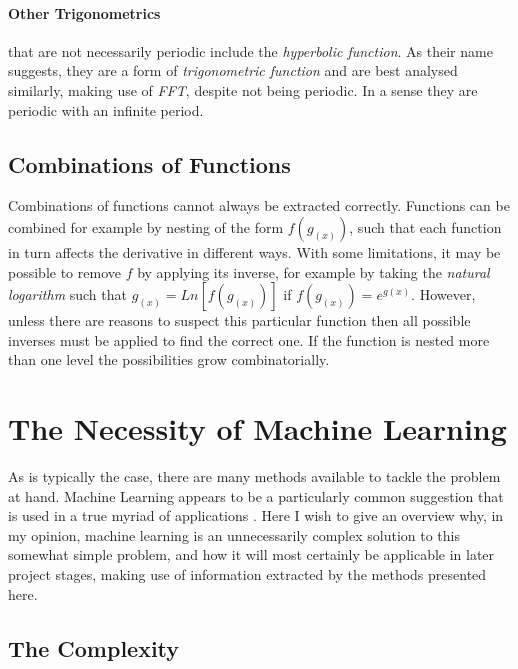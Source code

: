 \documentclass[main.tex]{subfiles}
\begin{document}
      \paragraph{Other Trigonometrics} that are not necessarily periodic include the \textit{hyperbolic function}. As their name suggests, they are a form of \textit{trigonometric function} and are best analysed similarly, making use of \textit{FFT}, despite not being periodic. In a sense they are periodic with an infinite period. 
    
    \subsection{Combinations of Functions}
      Combinations of functions cannot always be extracted correctly. Functions can be combined for example by nesting of the form $f(g_{(x)})$, such that each function in turn affects the derivative in different ways. With some limitations, it may be possible to remove $f$ by applying its inverse, for example by taking the \textit{natural logarithm} such that $g_{(x)}=Ln\left [ f(g_{(x)})\right ]$ if $f(g_{(x)}) = e^{g(x)}$. However, unless there are reasons to suspect this particular function then all possible inverses must be applied to find the correct one. If the function is nested more than one level the possibilities grow combinatorially. 
      
      
    
  \section{The Necessity of Machine Learning}
  
    As is typically the case, there are many methods available to tackle the problem at hand. Machine Learning appears to be a particularly common suggestion that is used in a true myriad of applications \cite{}. Here I wish to give an overview why, in my opinion, machine learning is an unnecessarily complex solution to this somewhat simple problem, and how it will most certainly be applicable in later project stages, making use of information extracted by the methods presented here.
    
    \subsection{The Complexity}
    
\end{document}
